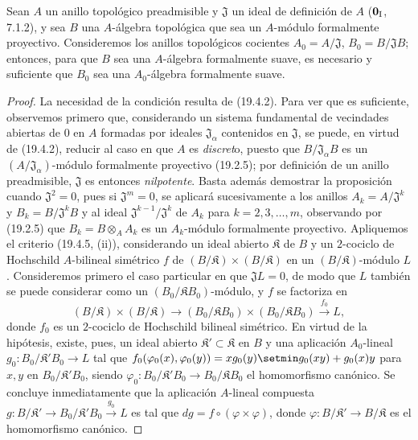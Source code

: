 \begin{proposition}[19.4.7]
\label{0.19.4.7-fr}
Sean $A$ un anillo topológico preadmisible y $\mathfrak J$ un ideal de
definición de $A$ \textup{($\mathbf 0_{\rm I}$, 7.1.2)}, y sea $B$ una $A$-álgebra
topológica que sea un $A$-módulo formalmente proyectivo. Consideremos los
anillos topológicos cocientes $A_0=A/\mathfrak J$,
$B_0=B/\mathfrak JB$; entonces, para que $B$ sea 
una $A$-álgebra formalmente
suave, es necesario y suficiente que $B_0$ sea una $A_0$-álgebra formalmente
suave.
\end{proposition}



\begin{proof}
La necesidad de la condición resulta de (19.4.2). Para ver que es
suficiente, observemos primero que, considerando un sistema fundamental de
vecindades abiertas de $0$ en $A$ formadas por ideales
$\mathfrak J_\alpha$ contenidos en $\mathfrak J$, se puede, en virtud de
(19.4.2), reducir al caso en que $A$ es \emph{discret}o, puesto que
$B/\mathfrak J_\alpha B$ es un
$(A/\mathfrak J_\alpha)$-módulo formalmente proyectivo (19.2.5); por
definición de un anillo preadmisible, $\mathfrak J$ es entonces
\emph{nilpotente}. Basta además demostrar la proposición cuando
$\mathfrak J^2=0$, pues si $\mathfrak J^m=0$, se aplicará sucesivamente
a los anillos $A_k=A/\mathfrak J^k$ y $B_k=B/\mathfrak J^kB$ y al ideal
$\mathfrak J^{k-1}/\mathfrak J^k$ de $A_k$ para $k=2,3,\ldots,m$,
observando por (19.2.5) que $B_k=B\otimes_A A_k$ es un $A_k$-módulo formalmente
proyectivo. Apliquemos el criterio (19.4.5, (ii)), considerando un ideal abierto
$\mathfrak K$ de $B$ y un $2$-cociclo de Hochschild $A$-bilineal
simétrico $f$ de $(B/\mathfrak K)\times(B/\mathfrak K)$ en un
$(B/\mathfrak K)$-módulo $L$. Consideremos primero el caso particular en que
$\mathfrak JL=0$, de modo que $L$ también se puede considerar como un
$(B_0/\mathfrak KB_0)$-módulo, y $f$ se factoriza en
\[
  (B/\mathfrak K)\times(B/\mathfrak K)\to
  (B_0/\mathfrak KB_0)\times(B_0/\mathfrak KB_0)
  \xrightarrow{f_0}L,
\]
donde $f_0$ es un $2$-cociclo de Hochschild bilineal simétrico. En virtud de
la hipótesis, existe, pues, un ideal abierto
$\mathfrak K'\subset\mathfrak K$ en $B$ y una aplicación
$A_0$-lineal $g_0:B_0/\mathfrak K'B_0\to L$ tal que
$f_0(\varphi_0(x),\varphi_0(y))
=xg_0(y)\setmin g_0(xy)+g_0(x)y$
para $x,y$ en $B_0/\mathfrak K'B_0$, siendo $\varphi_0:B_0/\mathfrak K'B_0\to B_0/\mathfrak KB_0$ el
homomorfismo canónico. Se concluye inmediatamente que
la aplicación $A$-lineal compuesta
$g:B/\mathfrak K'\to B_0/\mathfrak K'B_0\xrightarrow{g_0}L$ es tal
que $dg=f\circ(\varphi\times\varphi)$, donde
$\varphi:B/\mathfrak K'\to B/\mathfrak K$ es el homomorfismo
canónico.


\end{proof}
